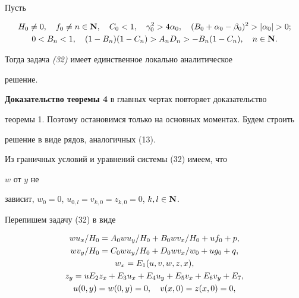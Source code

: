 \begin{thm}


Пусть


\begin{gather*}


H_0\ne 0,\quad f_0\ne n\in\bold N,\quad C_0<1,\quad


\gamma^2_0>4\alpha_0,\quad


(B_0+\alpha_0-\beta_0)^2>|\alpha_0|>0;\\


0<B_n<1,\quad (1-B_n)(1-C_n)>A_nD_n>-B_n(1-C_n),\quad


n\in\bold N.


\end{gather*}


Тогда задача {\em (32)} имеет единственное локально аналитическое


решение.


\end{thm}





{\bf Доказательство теоремы 4} в главных чертах повторяет доказательство


теоремы 1. Поэтому остановимся только на основных моментах. Будем строить


решение в виде рядов, аналогичных (13).





Из граничных условий и уравнений системы (32) имеем, что


$w$ от $y$ не


зависит, $w_0=0$, $u_{0,l}=v_{k,0}=z_{k,0}=0$, $k,l\in\bold N$.





Перепишем задачу (32) в виде


\begin{gather}


wu_x/H_0=A_0wu_y/H_0+B_0wv_x/H_0+uf_0+p,\notag\\


wv_y/H_0=C_0wu_y/H_0+D_0wv_x/w_0+ug_0+q,\notag\\


w_x=E_1(u,v,w,z,x),\\


z_y=uE_2z_x+E_3u_x+E_4u_y+E_5v_x+E_6v_y+E_7,\notag\\


u(0,y)=w(0,y)=0,\quad v(x,0)=z(x,0)=0,\notag


\end{gather}


